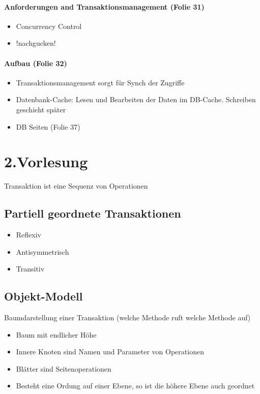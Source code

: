 \documentclass[ngerman]{scrartcl}
\begin{document}
\paragraph*{Anforderungen and Transaktionsmanagement (Folie 31)}
\begin{itemize}
  \item Concurrency Control
  \item !nachgucken!
\end{itemize}

\paragraph*{Aufbau (Folie 32)}
\begin{itemize}
  \item Transaktionsmanagement sorgt für Synch der Zugriffe
  \item Datenbank-Cache: Lesen und Bearbeiten der Daten im DB-Cache. Schreiben geschieht später
  \item DB Seiten (Folie 37)
\end{itemize}


\section{2.Vorlesung}
Transaktion ist eine Sequenz von Operationen

\subsection*{Partiell geordnete Transaktionen}
\begin{itemize}
  \item Reflexiv
  \item Antisymmetrisch
  \item Transitiv
\end{itemize}
\subsection{Objekt-Modell}
Baumdarstellung einer Transaktion (welche Methode ruft welche Methode auf)
\begin{itemize}
  \item Baum mit endlicher Höhe
  \item Innere Knoten sind Namen und Parameter von Operationen
  \item Blätter sind Seitenoperationen
  \item Besteht eine Ordung auf einer Ebene, so ist die höhere Ebene auch geordnet
\end{itemize}
\end{document}
